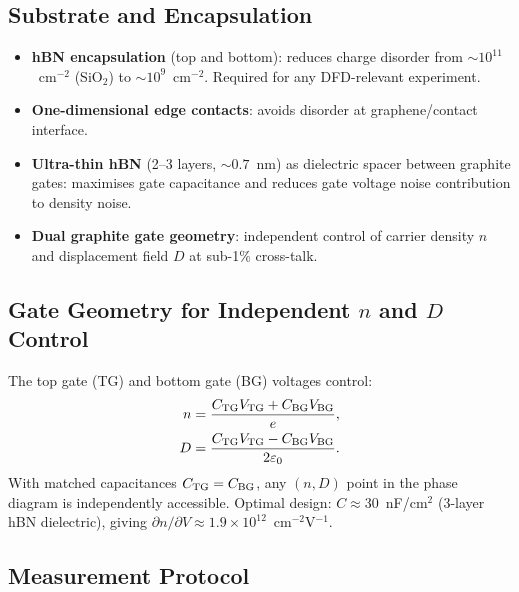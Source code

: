 \documentclass[11pt]{article}
\newcommand{\ee}[1]{\times 10^{#1}}
\begin{document}
\subsection{Substrate and Encapsulation}

\begin{itemize}
  \item \textbf{hBN encapsulation} (top and bottom): reduces charge
    disorder from $\sim 10^{11}$~cm$^{-2}$ (SiO$_2$) to
    $\sim 10^9$~cm$^{-2}$. Required for any DFD-relevant experiment.
  \item \textbf{One-dimensional edge contacts}: avoids disorder at
    graphene/contact interface.
  \item \textbf{Ultra-thin hBN} (2--3 layers, $\sim 0.7$~nm) as dielectric
    spacer between graphite gates: maximises gate capacitance and reduces
    gate voltage noise contribution to density noise.
  \item \textbf{Dual graphite gate geometry}: independent control of
    carrier density $n$ and displacement field $D$ at sub-1\% cross-talk.
\end{itemize}

\subsection{Gate Geometry for Independent $n$ and $D$ Control}

The top gate (TG) and bottom gate (BG) voltages control:
\begin{align}
  n &= \frac{C_{\rm TG} V_{\rm TG} + C_{\rm BG} V_{\rm BG}}{e},
  \label{eq:n_control}\\
  D &= \frac{C_{\rm TG} V_{\rm TG} - C_{\rm BG} V_{\rm BG}}{2\varepsilon_0}.
  \label{eq:D_control}
\end{align}
With matched capacitances $C_{\rm TG} = C_{\rm BG}$, any $(n, D)$ point
in the phase diagram is independently accessible. Optimal design:
$C \approx 30$~nF/cm$^2$ (3-layer hBN dielectric), giving
$\partial n/\partial V \approx 1.9\ee{12}$~cm$^{-2}$V$^{-1}$.

\subsection{Measurement Protocol}
\end{document}
